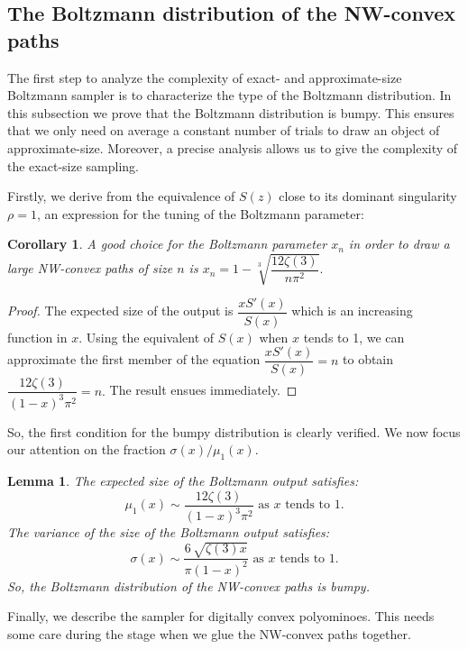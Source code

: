 \documentclass{article}
\newtheorem{lemma}[theorem]{Lemma}
\newtheorem{corollary}[theorem]{Corollary}
\begin{document}
\subsection{The Boltzmann distribution of the NW-convex paths}
The first step to analyze the complexity of exact- and
approximate-size Boltzmann sampler is to characterize the type of
the Boltzmann distribution. In this subsection we prove that the Boltzmann distribution
is bumpy. This ensures that we only need on average a constant
number of trials to draw an object of approximate-size. Moreover,
a precise analysis allows us to give the complexity of the
exact-size sampling.

Firstly, we derive from the equivalence of $S(z)$ close to its dominant singularity $\rho=1$, an expression for the tuning of the Boltzmann
parameter:

\begin{corollary}
\label{corgoodchoice}
A good choice for the Boltzmann parameter $x_n$ in
order to draw a large NW-convex paths of size $n$ is
$x_n=1-\sqrt [3]{{\dfrac {12\zeta  \left( 3 \right) }{n{\pi }^{2}
}}}.$

\end{corollary}
\begin{proof}
The expected size of the output is $\dfrac{xS'(x)}{S(x)}$ which is an increasing function in $x$. Using the equivalent of $S(x)$ when $x$ tends to 1, we can approximate the first member of the equation $\dfrac{xS'(x)}{S(x)}=n$ to obtain $\dfrac {12\zeta  \left( 3 \right) }{ \left( 1-x \right) ^{3}{\pi }^{
2}}=n.$ The result ensues immediately.
\end{proof}

So, the first
condition for the bumpy distribution is clearly verified. We now
focus our attention on the fraction $\sigma(x)/\mu_1(x)$.

\begin{lemma} \label{lem:bumpy}
The expected size of the Boltzmann output satisfies:
$$\mu_1(x)\sim \dfrac {12\zeta  \left( 3 \right) }{ \left( 1-x
\right) ^{3}{\pi }^{ 2}} \mbox{ as } x \mbox{ tends to 1.}$$ The
variance of the size of the Boltzmann output satisfies:
$$\sigma(x)\sim \frac{6\,\sqrt {\zeta  \left( 3 \right)  {
{x}}}}{\pi{ \left( 1-x
 \right) ^{2}} }
\mbox{ as } x \mbox{ tends to 1.}$$
So, the Boltzmann distribution of the NW-convex paths is bumpy.
\end{lemma}




Finally, we
describe the sampler for digitally convex polyominoes. This needs
some care during the stage when we glue the NW-convex paths together.
\end{document}
